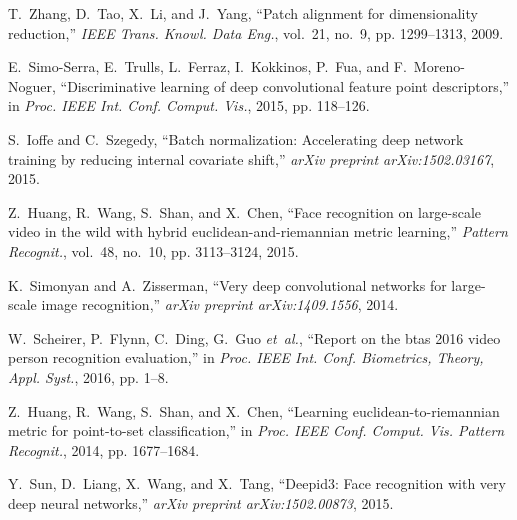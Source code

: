 \documentclass[10pt,journal,cspaper,compsoc]{IEEEtran}
\begin{document}
\begin{thebibliography}{10}
T.~Zhang, D.~Tao, X.~Li, and J.~Yang, ``Patch alignment for dimensionality
  reduction,'' \emph{IEEE Trans. Knowl. Data Eng.}, vol.~21, no.~9, pp.
  1299--1313, 2009.

E.~Simo-Serra, E.~Trulls, L.~Ferraz, I.~Kokkinos, P.~Fua, and F.~Moreno-Noguer,
  ``Discriminative learning of deep convolutional feature point descriptors,''
  in \emph{Proc. IEEE Int. Conf. Comput. Vis.}, 2015, pp. 118--126.

S.~Ioffe and C.~Szegedy, ``Batch normalization: Accelerating deep network
  training by reducing internal covariate shift,'' \emph{arXiv preprint
  arXiv:1502.03167}, 2015.

Z.~Huang, R.~Wang, S.~Shan, and X.~Chen, ``Face recognition on large-scale
  video in the wild with hybrid euclidean-and-riemannian metric learning,''
  \emph{Pattern Recognit.}, vol.~48, no.~10, pp. 3113--3124, 2015.

K.~Simonyan and A.~Zisserman, ``Very deep convolutional networks for
  large-scale image recognition,'' \emph{arXiv preprint arXiv:1409.1556}, 2014.

W.~Scheirer, P.~Flynn, C.~Ding, G.~Guo \emph{et~al.}, ``Report on the btas 2016
  video person recognition evaluation,'' in \emph{Proc. IEEE Int. Conf.
  Biometrics, Theory, Appl. Syst.}, 2016, pp. 1--8.

Z.~Huang, R.~Wang, S.~Shan, and X.~Chen, ``Learning euclidean-to-riemannian
  metric for point-to-set classification,'' in \emph{Proc. IEEE Conf. Comput.
  Vis. Pattern Recognit.}, 2014, pp. 1677--1684.

Y.~Sun, D.~Liang, X.~Wang, and X.~Tang, ``Deepid3: Face recognition with very
  deep neural networks,'' \emph{arXiv preprint arXiv:1502.00873}, 2015.

\end{thebibliography}







\end{document}
